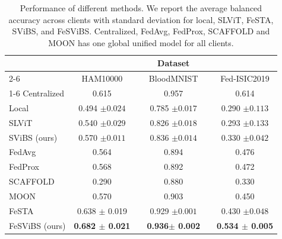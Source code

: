 \documentclass[runningheads]{llncs}
\begin{document}
\begin{table}[t!]
\centering
\caption{Performance of different methods. We report the average balanced accuracy across clients with standard deviation for local, SLViT, FeSTA, SViBS, and FeSViBS. Centralized, FedAvg, FedProx, SCAFFOLD and MOON has one global unified model for all clients.}
\label{tab:my-table}
\begin{tabular}{@{}lccccc@{}}
\toprule
\multirow{2}{*}{} & \multicolumn{5}{c}{\textbf{Dataset}}                                       \\ \cmidrule(l){2-6} 
                  & HAM10000 &  & BloodMNIST &  & Fed-ISIC2019 \\ \cmidrule(l){1-6}
Centralized       & 0.615             &  & 0.957               &  & 0.614              \\
Local             & 0.494 $\pm 0.024$            &  & 0.785 $\pm 0.017$               &  & 0.290 $\pm 0.113 $             \\
SLViT   & 0.540 $\pm 0.029$           &  & 0.826 $\pm 0.018$              &  & 0.293 $\pm 0.133$             \\
SViBS (ours)              & 0.570 $\pm 0.011$                 &  & 0.836 $\pm 0.014$                  &  & 0.330 $\pm 0.042$                \\
FedAvg \cite{mcmahan2017communication}           & 0.564             &  & 0.894               &  & 0.476             \\
FedProx \cite{li2020federated}           & 0.568             &  & 0.892               &  & 0.472             \\
SCAFFOLD \cite{SCAFFOLD}           & 0.290            &  & 0.880               &  & 0.330             \\
MOON \cite{MOON}           & 0.570             &  & 0.903              &  & 0.450             \\
FeSTA \cite{visonVits}           & 0.638 $\pm$ 0.019            &  & 0.929 $\pm 0.001$              &  & 0.430 $\pm 0.048$            \\
FeSViBS (ours)           & \textbf{0.682 $\pm$ 0.021}    &  & \textbf{0.936$\pm$ 0.002}      &  & \textbf{0.534 $\pm$ 0.005}    \\ \bottomrule
\end{tabular}
\end{table}
\end{document}
